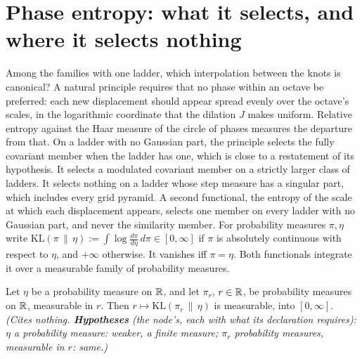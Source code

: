 \section{Phase entropy: what it selects, and where it selects nothing}
\label{sec:line-phase-entropy}

Among the families with one ladder, which interpolation between the knots is canonical? A natural
principle requires that no phase within an octave be preferred: each new displacement should appear
spread evenly over the octave's scales, in the logarithmic coordinate that the dilation $J$ makes
uniform. Relative entropy against the Haar measure of the circle of phases measures the departure
from that. On a ladder with no Gaussian part, the principle selects the fully covariant member when
the ladder has one, which is close to a restatement of its hypothesis. It selects a modulated
covariant member on a strictly larger class of ladders. It selects nothing on a ladder whose step
measure has a singular part, which includes every grid pyramid. A second functional, the entropy
of the scale at which each displacement appears, selects one member on every ladder with no
Gaussian part, and never the similarity member. For probability measures
$\pi, \eta$ write $\mathrm{KL}(\pi \,\|\, \eta) := \int\log\frac{d\pi}{d\eta}\,d\pi \in [0,\infty]$
if $\pi$ is absolutely continuous with respect to $\eta$, and $+\infty$ otherwise. It vanishes iff
$\pi = \eta$. Both functionals integrate it over a measurable family of probability measures.

\begin{lemma}
\label{lem:kl-measurable}
\leanok
Let $\eta$ be a probability measure on $\mathbb{R}$, and let $\pi_r$, $r \in \mathbb{R}$, be probability measures
on $\mathbb{R}$, measurable in $r$. Then $r \mapsto \mathrm{KL}(\pi_r \,\|\, \eta)$ is measurable, into
$[0,\infty]$.
\statusT\quad\emph{(Cites nothing. \textbf{Hypotheses} (the node's, each with what its declaration
requires): $\eta$ a probability measure: weaker, a finite measure; $\pi_r$ probability measures,
measurable in $r$: same.)}
\end{lemma}

